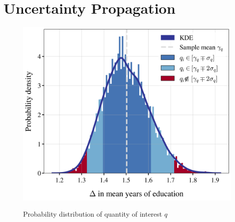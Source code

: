 \section{Uncertainty Propagation}
\thispagestyle{plain} %

\begin{figure}[H]
	\caption{Probability distribution of quantity of interest $q$}
	\centering
	\includegraphics[scale=0.7]{../python/figures/distplot}
	\label{fig:dist}
\end{figure}



